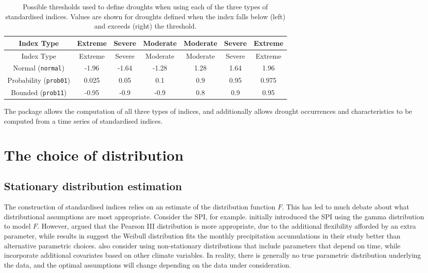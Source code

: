 \begin{longtable}[]{@{}ccccccc@{}}
\caption{\label{tab:unnamed-chunk-1}Possible thresholds used to define droughts when using each of the three types of standardised indices. Values are shown for droughts defined when the index falls below (left) and exceeds (right) the threshold.}\tabularnewline
\toprule\noalign{}
Index Type & Extreme & Severe & Moderate & Moderate & Severe & Extreme \\
\midrule\noalign{}
\endfirsthead
\toprule\noalign{}
Index Type & Extreme & Severe & Moderate & Moderate & Severe & Extreme \\
\midrule\noalign{}
\endhead
\bottomrule\noalign{}
\endlastfoot
Normal (\texttt{normal}) & -1.96 & -1.64 & -1.28 & 1.28 & 1.64 & 1.96 \\
Probability (\texttt{prob01}) & 0.025 & 0.05 & 0.1 & 0.9 & 0.95 & 0.975 \\
Bounded (\texttt{prob11}) & -0.95 & -0.9 & -0.9 & 0.8 & 0.9 & 0.95 \\
\end{longtable}

The  package allows the computation of all three types of indices, and additionally allows drought occurrences and characteristics to be computed from a time series of standardised indices.

\hypertarget{the-choice-of-distribution}{%
\section{The choice of distribution}\label{the-choice-of-distribution}}

\hypertarget{stationary-distribution-estimation}{%
\subsection{Stationary distribution estimation}\label{stationary-distribution-estimation}}

The construction of standardised indices relies on an estimate of the distribution function \(F\). This has led to much debate about what distributional assumptions are most appropriate. Consider the SPI, for example. \cite{MckeeEtAl1993} initially introduced the SPI using the gamma distribution to model \(F\). However, \cite{Guttman1999} argued that the Pearson III distribution is more appropriate, due to the additional flexibility afforded by an extra parameter, while results in \cite{StaggeEtAl2015} suggest the Weibull distribution fits the monthly precipitation accumulations in their study better than alternative parametric choices. \cite{RussoEtAl2013} also consider using non-stationary distributions that include parameters that depend on time, while \cite{LiEtAl2015} incorporate additional covariates based on other climate variables. In reality, there is generally no true parametric distribution underlying the data, and the optimal assumptions will change depending on the data under consideration.

